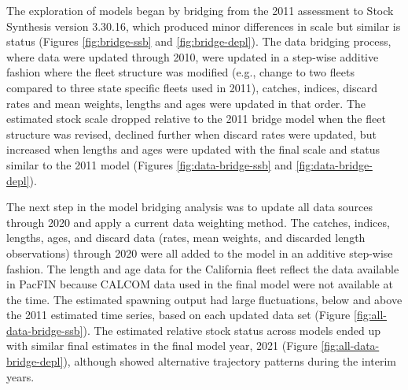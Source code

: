 \documentclass[11pt,
  english,
  a4paper,
]{article}
\begin{document}

The exploration of models began by bridging from the 2011 assessment to Stock Synthesis version 3.30.16, which produced minor differences in scale but similar is status (Figures \ref{fig:bridge-ssb} and \ref{fig:bridge-depl}). The data bridging process, where data were updated through 2010, were updated in a step-wise additive fashion where the fleet structure was modified (e.g., change to two fleets compared to three state specific fleets used in 2011), catches, indices, discard rates and mean weights, lengths and ages were updated in that order. The estimated stock scale dropped relative to the 2011 bridge model when the fleet structure was revised, declined further when discard rates were updated, but increased when lengths and ages were updated with the final scale and status similar to the 2011 model (Figures \ref{fig:data-bridge-ssb} and \ref{fig:data-bridge-depl}).

\leavevmode\tagmcend\tagstructend\par


The next step in the model bridging analysis was to update all data sources through 2020 and apply a current data weighting method. The catches, indices, lengths, ages, and discard data (rates, mean weights, and discarded length observations) through 2020 were all added to the model in an additive step-wise fashion. The length and age data for the California fleet reflect the data available in PacFIN because CALCOM data used in the final model were not available at the time. The estimated spawning output had large fluctuations, below and above the 2011 estimated time series, based on each updated data set (Figure \ref{fig:all-data-bridge-ssb}). The estimated relative stock status across models ended up with similar final estimates in the final model year, 2021 (Figure \ref{fig:all-data-bridge-depl}), although showed alternative trajectory patterns during the interim years.

\leavevmode\tagmcend\tagstructend\par

\end{document}
